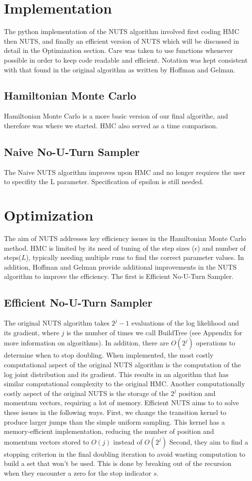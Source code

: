 \documentclass[12pt]{article}
\begin{document}
\section{Implementation}
The python implementation of the NUTS algorithm involved first coding HMC then NUTS, and finally an efficient version of NUTS which will be discussed in detail in the Optimization section. Care was taken to use functions whenever possible in order to keep code readable and efficient.  Notation was kept consistent with that found in the original algorithm as written by Hoffman and Gelman.
\subsection{Hamiltonian Monte Carlo}
Hamiltonian Monte Carlo is a more basic version of our final algorithe, and therefore was where we started.  HMC also served as a time comparison. 

\subsection{Naive No-U-Turn Sampler}
The Naive NUTS algorithm improves upon HMC and no longer requires the user to specifity the L parameter.  Specification of epsilon is still needed.

\section{Optimization}
The aim of NUTS addresses key efficiency issues in the Hamiltonian Monte Carlo method. HMC is limited by its need of tuning of the step sizes ($\epsilon$) and number of steps($L$), typically needing multiple runs to find the correct parameter values. In addition, Hoffman and Gelman provide additional improvements in the NUTS algorithm to improve the efficiency. The first is Efficient No-U-Turn Sampler.
\subsection{Efficient No-U-Turn Sampler}
The original NUTS algorithm takes $2^j -1$ evaluations of the log likelihood and its gradient, where $j$ is the number of times we call BuildTree (see Appendix for more information on algorithms). In addition, there are $O(2^j)$ operations to determine when to stop doubling. When implemented, the most costly computational aspect of the original NUTS algorithm is the computation of the log joint distribution and its gradient. This results in an algorithm that has similar computational complexity to the original HMC. Another computationally costly aspect of the original NUTS is the storage of the $2^j$ position and momentum vectors, requiring a lot of memory.  Efficient NUTS aims to to solve these issues in the following ways. First, we change the transition kernel to produce larger jumps than the simple uniform sampling. This kernel has a memory-efficient implementation, reducing the number of position and momentum vectors stored to $O(j)$ instead of $O(2^j)$ Second, they aim to find a stopping criterion in the final doubling iteration to avoid wasting computation to build a set that won't be used. This is done by breaking out of the recursion when they encounter a zero for the stop indicator $s$.
  
\end{document}

